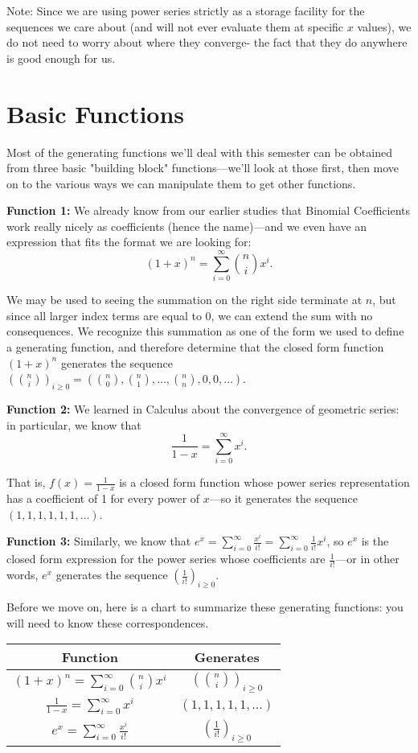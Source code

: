 \documentclass{article}
\theoremstyle{definition}
\begin{document}
Note: Since we are using power series strictly as a storage facility for the sequences we care about (and will not ever evaluate them at specific $x$ values), we do not need to worry about where they converge- the fact that they do anywhere is good enough for us.

\section*{Basic Functions}
Most of the generating functions we'll deal with this semester can be obtained from three basic "building block" functions---we'll look at those first, then move on to the various ways we can manipulate them to get other functions.

\textbf{Function 1:} We already know from our earlier studies that Binomial Coefficients work really nicely as coefficients (hence the name)---and we even have an expression that fits the format we are looking for:
\[(1+x)^{n}=\sum_{i=0}^{\infty}\binom{n}{i} x^{i}.\]

We may be used to seeing the summation on the right side terminate at $n$, but since all larger index terms are equal to 0, we can extend the sum with no consequences. We recognize this summation as one of the form we used to define a generating function, and therefore determine that the closed form function $(1+x)^{n}$ generates the sequence $\left(\binom{n}{i}\right)_{i \geq 0}=\left(\binom{n}{0},\binom{n}{1}, \ldots,\binom{n}{n}, 0,0, \ldots\right)$.

\textbf{Function 2:} We learned in Calculus about the convergence of geometric series: in particular, we know that
\[\frac{1}{1-x}=\sum_{i=0}^{\infty} x^{i}.\]

That is, $f(x)=\frac{1}{1-x}$ is a closed form function whose power series representation has a coefficient of 1 for every power of $x$---so it generates the sequence $(1,1,1,1,1,1, \ldots)$.

\textbf{Function 3:} Similarly, we know that $e^{x}=\sum_{i=0}^{\infty} \frac{x^{i}}{i!}=\sum_{i=0}^{\infty} \frac{1}{i!} x^{i}$, so $e^{x}$ is the closed form expression for the power series whose coefficients are $\frac{1}{i!}$---or in other words, $e^{x}$ generates the sequence $\left(\frac{1}{i!}\right)_{i \geq 0}$.

Before we move on, here is a chart to summarize these generating functions: you will need to know these correspondences.

\begin{center}
\begin{tabular}{|c|c|}
\hline
\textbf{Function} & \textbf{Generates} \\
\hline
$(1+x)^{n} = \sum_{i=0}^{\infty}\binom{n}{i} x^{i}$ & $\left(\binom{n}{i}\right)_{i \geq 0}$ \\
\hline
$\frac{1}{1-x} = \sum_{i=0}^{\infty} x^{i}$ & $(1,1,1,1,1, \ldots)$ \\
\hline
$e^{x} = \sum_{i=0}^{\infty} \frac{x^{i}}{i!}$ & $\left(\frac{1}{i!}\right)_{i \geq 0}$ \\
\hline
\end{tabular}
\end{center}
\end{document}
